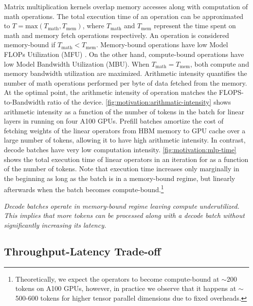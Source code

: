 Matrix multiplication kernels overlap memory accesses along with computation of math operations. The total execution time of an operation can be approximated to $T = \text{max}(T_{\text{math}}, T_{\text{mem}})$, where $T_{\text{math}}$ and $T_{\text{mem}}$ represent the time spent on math and memory fetch operations respectively. An operation is considered memory-bound if $T_{\text{math}} < T_{\text{mem}}$. Memory-bound operations have low Model FLOPs Utilization (MFU) \cite{chowdhery2022Palm}. On the other hand, compute-bound operations have low Model Bandwidth Utilization (MBU).
When $T_{\text{math}} = T_{\text{mem}}$, both compute and memory bandwidth utilization are maximized. Arithmetic intensity quantifies the number of math operations performed per byte of data fetched from the memory. At the optimal point, the arithmetic  intensity of operation matches the FLOPS-to-Bandwidth ratio of the device. \autoref{fig:motivation:arithmatic-intensity} shows arithmetic intensity as a function of the number of tokens in the batch for linear layers in \llamaL running on four A100 GPUs. Prefill batches amortize the cost of fetching weights of the linear operators from HBM memory to GPU cache over a large number of tokens, allowing it to have high arithmetic intensity. In contrast, decode batches have very low computation intensity. \autoref{fig:motivation:mlp-time} shows the total execution time of linear operators in an iteration for \llamaL as a function of the number of tokens. Note that execution time increases only marginally in the beginning \ie as long as the batch is in a memory-bound regime, but linearly afterwards \ie when the batch becomes compute-bound.\footnote{Theoretically, we expect the operators to become compute-bound at $\sim$200 tokens on A100 GPUs, however, in practice we observe that it happens at $\sim$500-600 tokens for higher tensor parallel dimensions due to fixed overheads.}







 \textit{Decode batches operate in memory-bound regime leaving compute underutilized. This implies that more tokens can be processed along with a decode batch without significantly increasing its latency.} %



\subsection{Throughput-Latency Trade-off}
\label{sec:latencyandstalls}



